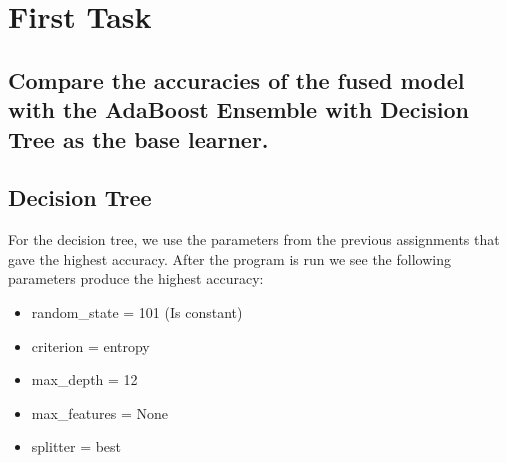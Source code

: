 \documentclass{article}
\begin{document}
\section{First Task}
\subsection{Compare the accuracies of the fused model with the AdaBoost Ensemble with Decision Tree as the base learner.}

\subsection{Decision Tree}
For the decision tree, we use the parameters from the previous assignments that gave the highest accuracy.
\vspace{1cm}
 After the program is run we see the following parameters produce the highest accuracy:
 \begin{itemize}
     \item random\_state = 101 (Is constant)
     \item criterion =  entropy 
     \item max\_depth =  12  
     \item max\_features =  None 
     \item splitter =  best
     
 \end{itemize}
\end{document}
